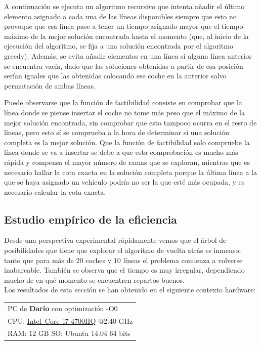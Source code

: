 \documentclass[a4paper, 11pt]{article}
\makeatletter
\newcommand{\spec}[6]{
	\bgroup
	\def\arraystretch{1.2}
	\begin{tabular}{|l|}
		\hline
		PC de \textbf{#1} con optimización -O#6\\
		CPU: #2 @#3 GHz\\RAM: #4 GB \hspace{0.8cm} SO: #5 \\
		\hline
	\end{tabular}
	\egroup
	\vspace*{0.2cm}
}
\def\arraystretch{1.2} %
\makeatother
\begin{document}

A continuación se ejecuta un algoritmo recursivo que intenta añadir el último elemento asignado a cada una de las líneas disponibles siempre que esto no provoque que esa línea pase a tener un tiempo asignado mayor que el tiempo máximo de la mejor solución encontrada hasta el momento (que, al inicio de la ejecución del algoritmo, se fija a una solución encontrada por el algoritmo greedy). Además, se evita añadir elementos en una línea si alguna línea anterior se encuentra vacía, dado que las soluciones obtenidas a partir de esa posición serían iguales que las obtenidas colocando ese coche en la anterior salvo permutación de ambas líneas.


Puede observarse que la función de factibilidad consiste en comprobar que la línea donde se piense insertar el coche no tome más peso que el máximo de la mejor solución encontrada, sin comprobar que esto tampoco ocurra en el resto de líneas, pero esto sí se comprueba a la hora de determinar si una solución completa es la mejor solución. Que la función de factibilidad solo compruebe la línea donde se va a insertar se debe a que esta comprobación es mucho más rápida y compensa el mayor número de ramas que se exploran, mientras que es necesario hallar la cota exacta en la solución completa porque la última línea a la que se haya asignado un vehículo podría no ser la que esté más ocupada, y es necesario calcular la cota exacta.

\subsection{Estudio empírico de la eficiencia}

Desde una perspectiva experimental rápidamente vemos que el árbol de posibilidades que tiene que explorar el algoritmo de vuelta atrás es inmenso; tanto que para más de $20$ coches y $10$ líneas el problema comienza a volverse inabarcable. También se observa que el tiempo es muy irregular, dependiendo mucho de en qué momento se encuentren repartos buenos. \\

Los resultados de esta sección se han obtenido en el siguiente contexto hardware: \\
\spec{Darío}{\href{http://ark.intel.com/products/75116}{Intel\textregistered\ Core\texttrademark\ i7-4700HQ}}{2.40}{12}{Ubuntu 14.04 64 bits}{0} \\
\end{document}
